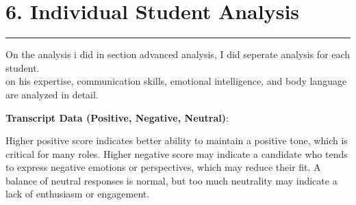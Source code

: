 \documentclass{article}
\begin{document}





\section{6. Individual Student Analysis}
  \begin{center}
        \color{red}\rule{1\linewidth}{1mm}
    \end{center}

On the analysis i did in section advanced analysis, I did seperate analysis for each student.\\
on his expertise, communication skills, emotional intelligence, and body language are analyzed in detail.\\

\large

\textbf{Transcript Data (Positive, Negative, Neutral)}:

Higher positive score indicates better ability to maintain a positive tone, which is critical for many roles.
Higher negative score may indicate a candidate who tends to express negative emotions or perspectives, which may reduce their fit.
A balance of neutral responses is normal, but too much neutrality may indicate a lack of enthusiasm or engagement.
\end{document}
